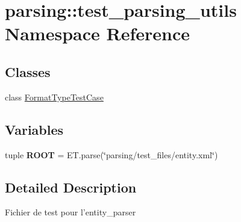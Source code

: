 \hypertarget{namespaceparsing_1_1test__parsing__utils}{\section{parsing\-:\-:test\-\_\-parsing\-\_\-utils \-Namespace \-Reference}
\label{namespaceparsing_1_1test__parsing__utils}
}
\subsection*{\-Classes}
\begin{DoxyCompactItemize}
\item 
class \hyperlink{classparsing_1_1test__parsing__utils_1_1_format_type_test_case}{\-Format\-Type\-Test\-Case}
\end{DoxyCompactItemize}
\subsection*{\-Variables}
\begin{DoxyCompactItemize}
\item 
\hypertarget{namespaceparsing_1_1test__parsing__utils_a06a43ca76ef8d4054452d4c2cdb7f921}{tuple {\bfseries \-R\-O\-O\-T} = \-E\-T.\-parse(\char`\"{}parsing/test\-\_\-files/entity.\-xml\char`\"{})}\label{namespaceparsing_1_1test__parsing__utils_a06a43ca76ef8d4054452d4c2cdb7f921}

\end{DoxyCompactItemize}


\subsection{\-Detailed \-Description}
\begin{DoxyVerb}
Fichier de test pour l'entity_parser
\end{DoxyVerb}
 